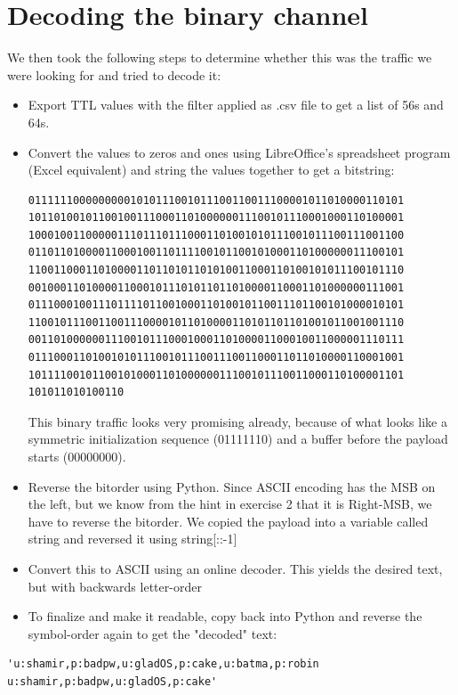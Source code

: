 \documentclass{article}
\begin{document}
\newpage
\section*{Decoding the binary channel}
We then took the following steps to determine whether this was the traffic we were looking for and tried to decode it:
\begin{itemize}
\item Export TTL values with the filter applied as .csv file to get a list of 56s and 64s.
\item Convert the values to zeros and ones using LibreOffice's spreadsheet program (Excel equivalent) and string the values together to get a bitstring: 
\begin{verbatim}
01111110000000001010111001011100110011100001011010000110101
10110100101100100111000110100000011100101110001000110100001
10001001100000111011101110001101001010111001011100111001100
01101101000011000100110111100101100101000110100000011100101
11001100011010000110110101101010011000110100101011100101110
00100011010000110001011101011011010000110001101000000111001
01110001001110111101100100011010010110011101100101000010101
11001011100110011100001011010000110101101101001011001001110
00110100000011100101110001000110100001100010011000001110111
01110001101001010111001011100111001100011011010000110001001
10111100101100101000110100000011100101110011000110100001101
101011010100110
\end{verbatim}
This binary traffic looks very promising already, because of what looks like a symmetric initialization sequence (01111110) and a buffer before the payload starts (00000000).

\item Reverse the bitorder using Python. Since ASCII encoding has the MSB on the left, but we know from the hint in exercise 2 that it is Right-MSB, we have to reverse the bitorder. We copied the payload into a variable called string and reversed it using string[::-1]
\item Convert this to ASCII using an online decoder. This yields the desired text, but with backwards letter-order
\item To finalize and make it readable, copy back into Python and reverse the symbol-order again to get the "decoded" text:
\end{itemize}

\begin{verbatim}
'u:shamir,p:badpw,u:gladOS,p:cake,u:batma,p:robin u:shamir,p:badpw,u:gladOS,p:cake'
\end{verbatim}
\end{document}
